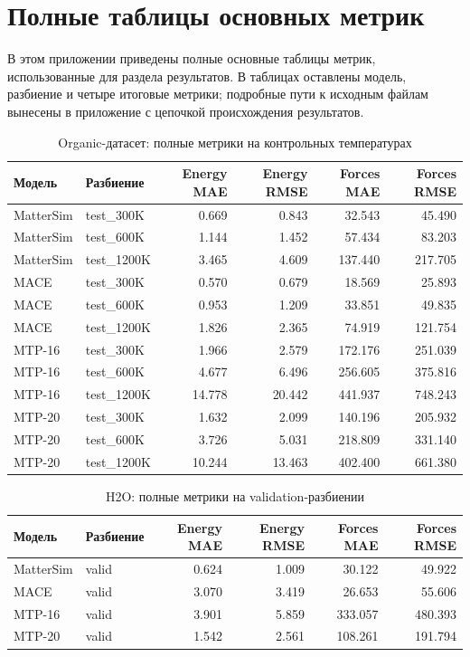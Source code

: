 \section{Полные таблицы основных метрик}

В этом приложении приведены полные основные таблицы метрик, использованные для раздела результатов. В таблицах оставлены модель, разбиение и четыре итоговые метрики; подробные пути к исходным файлам вынесены в приложение с цепочкой происхождения результатов.

\begin{table}[ht]
\centering
\scriptsize
\caption{Organic-датасет: полные метрики на контрольных температурах}
\label{tab:appendix_organic_full_metrics}
\begin{tabularx}{\textwidth}{@{}l l r r r r@{}}
\toprule
Модель & Разбиение & Energy MAE & Energy RMSE & Forces MAE & Forces RMSE \\
\midrule
MatterSim & test\_300K & 0.669 & 0.843 & 32.543 & 45.490 \\
MatterSim & test\_600K & 1.144 & 1.452 & 57.434 & 83.203 \\
MatterSim & test\_1200K & 3.465 & 4.609 & 137.440 & 217.705 \\
MACE & test\_300K & 0.570 & 0.679 & 18.569 & 25.893 \\
MACE & test\_600K & 0.953 & 1.209 & 33.851 & 49.835 \\
MACE & test\_1200K & 1.826 & 2.365 & 74.919 & 121.754 \\
MTP-16 & test\_300K & 1.966 & 2.579 & 172.176 & 251.039 \\
MTP-16 & test\_600K & 4.677 & 6.496 & 256.605 & 375.816 \\
MTP-16 & test\_1200K & 14.778 & 20.442 & 441.937 & 748.243 \\
MTP-20 & test\_300K & 1.632 & 2.099 & 140.196 & 205.932 \\
MTP-20 & test\_600K & 3.726 & 5.031 & 218.809 & 331.140 \\
MTP-20 & test\_1200K & 10.244 & 13.463 & 402.400 & 661.380 \\
\bottomrule
\end{tabularx}
\end{table}

\begin{table}[ht]
\centering
\scriptsize
\caption{H2O: полные метрики на validation-разбиении}
\label{tab:appendix_h2o_full_metrics}
\begin{tabularx}{\textwidth}{@{}l l r r r r@{}}
\toprule
Модель & Разбиение & Energy MAE & Energy RMSE & Forces MAE & Forces RMSE \\
\midrule
MatterSim & valid & 0.624 & 1.009 & 30.122 & 49.922 \\
MACE & valid & 3.070 & 3.419 & 26.653 & 55.606 \\
MTP-16 & valid & 3.901 & 5.859 & 333.057 & 480.393 \\
MTP-20 & valid & 1.542 & 2.561 & 108.261 & 191.794 \\
\bottomrule
\end{tabularx}
\end{table}

